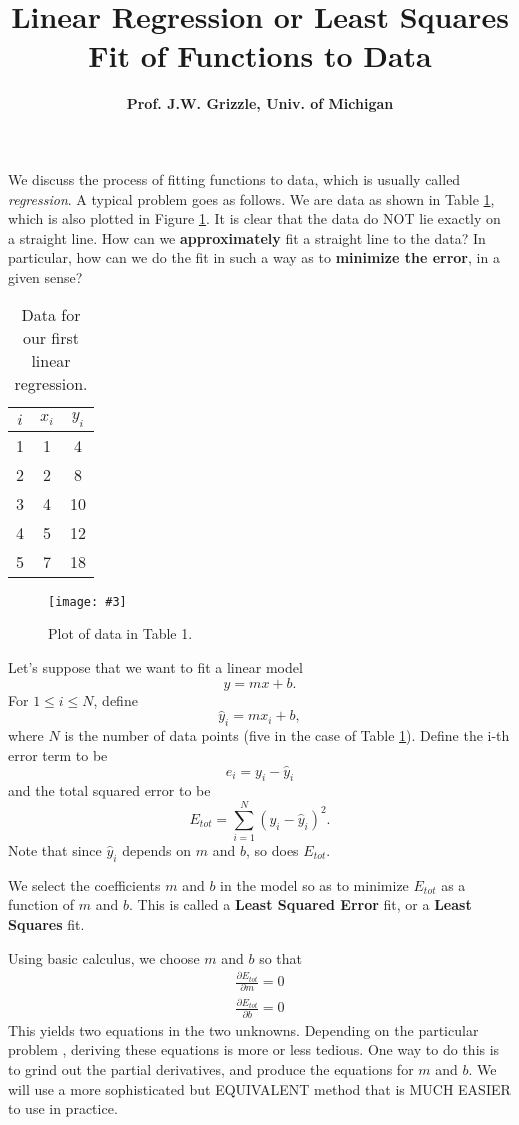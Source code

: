 \documentclass[11pt,twoside]{nsf_jwg} %
\newcommand{\spacing}[1]
  {\renewcommand{\baselinestretch}{#1}\small\normalsize}
\newcommand{\sizedfig}[4]{
\begin{figure}[!hbt]
       \centerline{ \texttt{[image: \#3]}}
        \caption{#1}
        \label{#2}
\end{figure}
}
\newcommand{\mytabone}[0]
{
\begin{table}[!hbt]
\caption[]{Data for our first linear regression.}
\label{tab1}
\spacing 1
\begin{center}
\begin{tabular}{||c|c|c||}
\hline
$ i$ & $x_i$ & $y_i$\\
\hline
1 &1  &   4 \\
 2& 2    &  8 \\
3& 4   & 10 \\
4& 5  &  12 \\
5 & 7   & 18 \\
\hline
\end{tabular}
\end{center}
\spacing 2
\end{table}
}
\newcommand{\myfigone}[0]
{\sizedfig{Plot of data in Table 1.}{fig1}
{fig1.eps}{4.5in}
}
\begin{document}
\baselineskip=24pt  %


\pagestyle{plain}

\title{\Large \bf  Linear Regression or Least Squares Fit of Functions to Data}

\author{ {\bf Prof. J.W. Grizzle, Univ. of Michigan}
}

\maketitle


\Large

We discuss the process of fitting functions to data, which is usually called \textit{regression}.  A typical problem goes as follows. We are data as shown in Table \ref{tab1}, which is also plotted in Figure \ref{fig1}. It is clear that the data do NOT lie exactly on a straight line. How can we {\bf approximately} fit a straight line to the data? In particular, how can we do the fit in such a way as to \textbf{minimize the error}, in a given sense?

\mytabone

\myfigone

Let's suppose that we want to fit a linear model $$ y=mx+b.$$ For $1 \le i \le N$, define
$$\hat y_i = m x_i +b,$$ where $N$ is the number of data points (five in the case of Table \ref{tab1}). Define the i-th error term to be $$e_i = y_i - \hat y_i $$
and the total squared error to be $$E_{tot} = \sum_{i=1}^{N} (y_i-\hat y_i)^2.$$ Note that since $\hat y_i$ depends on  $m$ and $b$, so does $E_{tot}$.

We select the coefficients $m$ and $b$ in the model so as to minimize $E_{tot}$ as a function of $m$ and $b$. This is called a {\bf Least Squared Error} fit, or a {\bf Least Squares} fit.

Using basic calculus, we choose $m$ and $b$ so that
\begin{eqnarray*}
\frac{\partial E_{tot}}{\partial m} = 0 \\
\frac{\partial E_{tot}}{\partial b} = 0
\end{eqnarray*}
This yields two equations in the two unknowns. Depending on the particular problem , deriving these equations is more or less tedious. One way to do this is to grind out the partial derivatives, and produce the equations for $m$ and $b$. We will use a more sophisticated but EQUIVALENT method that is MUCH EASIER to use in practice.
\end{document}
